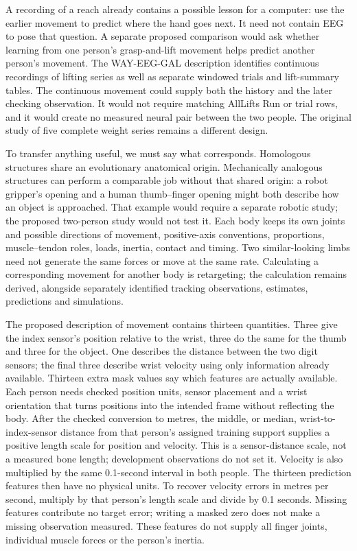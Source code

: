 A recording of a reach already contains a possible lesson for a computer: use the earlier movement to predict where the hand goes next. It need not contain EEG to pose that question. A separate proposed comparison would ask whether learning from one person's grasp-and-lift movement helps predict another person's movement. The WAY-EEG-GAL description identifies continuous recordings of lifting series as well as separate windowed trials and lift-summary tables.\citep{luciw2014way} The continuous movement could supply both the history and the later checking observation. It would not require matching AllLifts Run or trial rows, and it would create no measured neural pair between the two people. The original study of five complete weight series remains a different design.

To transfer anything useful, we must say what corresponds. Homologous structures share an evolutionary anatomical origin. Mechanically analogous structures can perform a comparable job without that shared origin: a robot gripper's opening and a human thumb--finger opening might both describe how an object is approached. That example would require a separate robotic study; the proposed two-person study would not test it. Each body keeps its own joints and possible directions of movement, positive-axis conventions, proportions, muscle--tendon roles, loads, inertia, contact and timing. Two similar-looking limbs need not generate the same forces or move at the same rate. Calculating a corresponding movement for another body is retargeting; the calculation remains derived, alongside separately identified tracking observations, estimates, predictions and simulations.

The proposed description of movement contains thirteen quantities. Three give the index sensor's position relative to the wrist, three do the same for the thumb and three for the object. One describes the distance between the two digit sensors; the final three describe wrist velocity using only information already available. Thirteen extra mask values say which features are actually available. Each person needs checked position units, sensor placement and a wrist orientation that turns positions into the intended frame without reflecting the body. After the checked conversion to metres, the middle, or median, wrist-to-index-sensor distance from that person's assigned training support supplies a positive length scale for position and velocity. This is a sensor-distance scale, not a measured bone length; development observations do not set it. Velocity is also multiplied by the same 0.1-second interval in both people. The thirteen prediction features then have no physical units. To recover velocity errors in metres per second, multiply by that person's length scale and divide by 0.1 seconds. Missing features contribute no target error; writing a masked zero does not make a missing observation measured. These features do not supply all finger joints, individual muscle forces or the person's inertia.


